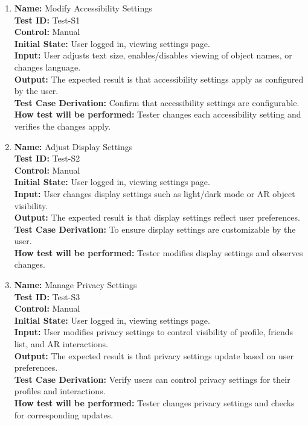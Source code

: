 \documentclass[12pt, titlepage]{article}
\begin{document}
\begin{enumerate}

  \item \textbf{Name:} {Modify Accessibility Settings} \label{itm:Test-S1}\\
        \textbf{Test ID:} Test-S1\\
        \textbf{Control:} Manual \\
        \textbf{Initial State:} User logged in, viewing settings page. \\
        \textbf{Input:} User adjusts text size, enables/disables viewing of object names, or changes language. \\
        \textbf{Output:} The expected result is that accessibility settings apply as configured by the user. \\
        \textbf{Test Case Derivation:} Confirm that accessibility settings are configurable. \\
        \textbf{How test will be performed:} Tester changes each accessibility setting and verifies the changes apply.

  \item \textbf{Name:} {Adjust Display Settings} \label{itm:Test-S2}\\
        \textbf{Test ID:} Test-S2\\
        \textbf{Control:} Manual \\
        \textbf{Initial State:} User logged in, viewing settings page. \\
        \textbf{Input:} User changes display settings such as light/dark mode or AR object visibility. \\
        \textbf{Output:} The expected result is that display settings reflect user preferences. \\
        \textbf{Test Case Derivation:} To ensure display settings are customizable by the user. \\
        \textbf{How test will be performed:} Tester modifies display settings and observes changes.

  \item \textbf{Name:} {Manage Privacy Settings} \label{itm:Test-S3}\\
        \textbf{Test ID:} Test-S3\\
        \textbf{Control:} Manual \\
        \textbf{Initial State:} User logged in, viewing settings page. \\
        \textbf{Input:} User modifies privacy settings to control visibility of profile, friends list, and AR interactions. \\
        \textbf{Output:} The expected result is that privacy settings update based on user preferences. \\
        \textbf{Test Case Derivation:} Verify users can control privacy settings for their profiles and interactions. \\
        \textbf{How test will be performed:} Tester changes privacy settings and checks for corresponding updates.


\end{enumerate}
\end{document}
